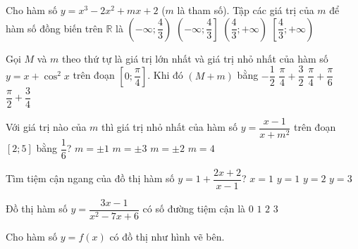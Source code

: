 \begin{ex}%
	Cho hàm số $y=x^3-2x^2+mx+2$ ($m$ là tham số). Tập các giá trị của $m$ để hàm số đồng biến trên $\mathbb{R}$ là
\choice
	{$\left(-\infty;\dfrac{4}{3}\right)$}
	{$\left(-\infty;\dfrac{4}{3}\right]$}
	{$\left(\dfrac{4}{3};+\infty\right)$}
	{\True $\left[\dfrac{4}{3};+\infty\right)$} 
\end{ex}\begin{ex}%
	Gọi $M$ và $m$ theo thứ tự là giá trị lớn nhất và giá trị nhỏ nhất của hàm số $y=x+\cos ^2 x$ trên đoạn $\left[0;\dfrac{\pi}{4}\right]$. Khi đó $(M+m)$ bằng
\choice
	{$-\dfrac{1}{2}$}
	{\True $\dfrac{\pi}{4}+\dfrac{3}{2}$}
	{$\dfrac{\pi}{4}+\dfrac{\pi}{6}$}
	{$\dfrac{\pi}{2}+\dfrac{3}{4}$} 
\end{ex}\begin{ex}%
	Với giá trị nào của $m$ thì giá trị nhỏ nhất của hàm số $y=\dfrac{x-1}{x+m^2}$ trên đoạn $\left[2;5\right]$ bằng $\dfrac{1}{6}$?
\choice
	{$m=\pm 1$}
	{$m=\pm 3$}
	{\True $m=\pm 2$}
	{$m=4$}
\end{ex}
\begin{ex}%
	Tìm tiệm cận ngang của đồ thị hàm số $y=1+\dfrac{2x+2}{x-1}$?
\choice
	{$x=1$}
	{$y=1$}
	{$y=2$}
	{\True $y=3$} 
\end{ex}
\begin{ex}%
	Đồ thị hàm số $y=\dfrac{3x-1}{x^2-7x+6}$ có số đường tiệm cận là
\choice
	{$0$}
	{$1$}
	{$2$}
	{\True $3$}
\end{ex}
\begin{ex}%
	Cho hàm số $y=f\left(x\right)$ có đồ thị như hình vẽ bên.
\end{ex}
